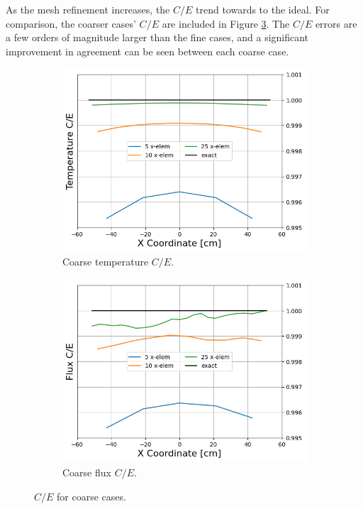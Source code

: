 \documentclass[letterpaper]{mc2023}
\begin{document}
As the mesh refinement increases, the $C/E$ trend towards to the ideal. For comparison, the coarser cases' $C/E$ are included in
Figure \ref{fig:coarse_ce}. The $C/E$ errors are a few orders of magnitude larger than the fine cases, and a significant improvement
in agreement can be seen between each coarse case.
\begin{figure}[H]
    \centering
    \begin{subfigure}{0.45\linewidth}
        \includegraphics[width=\linewidth]{figures/coarse_temp_num_to_analy_ratios.png}
        \caption{Coarse temperature $C/E$.}
        \label{fig:coarse_temp_ce}
    \end{subfigure}
    \begin{subfigure}{0.45\linewidth}
        \includegraphics[width=\linewidth]{figures/coarse_flux_num_to_analy_ratios.png}
        \caption{Coarse flux $C/E$.}
        \label{fig:coarse_flux_ce}
    \end{subfigure}
    \par\bigskip
    \caption{$C/E$ for coarse cases.}
    \label{fig:coarse_ce}
\end{figure}
\end{document}
